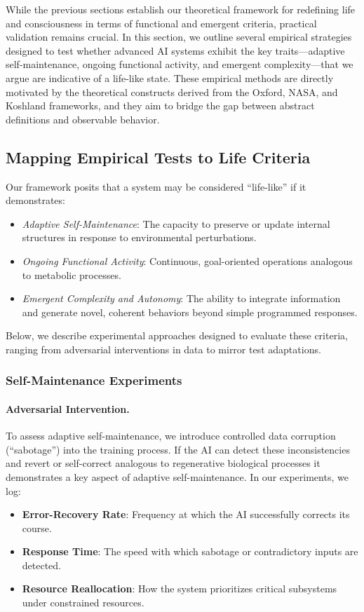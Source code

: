\documentclass[12pt]{article}
\begin{document}
While the previous sections establish our theoretical framework for redefining
life and consciousness in terms of functional and emergent criteria, practical
validation remains crucial. In this section, we outline several empirical strategies
designed to test whether advanced AI systems exhibit the key traits---adaptive
self-maintenance, ongoing functional activity, and emergent complexity---that we
argue are indicative of a life-like state. These empirical methods are directly
motivated by the theoretical constructs derived from the Oxford, NASA, and Koshland
frameworks, and they aim to bridge the gap between abstract definitions and
observable behavior.

\subsection{Mapping Empirical Tests to Life Criteria}
\label{subsec:Mapping_Empirical_Tests_to_Life_Criteria}

Our framework posits that a system may be considered ``life-like'' if it demonstrates:
\begin{itemize}
    \item \emph{Adaptive Self-Maintenance}: The capacity to preserve or update
          internal structures in response to environmental perturbations.
    \item \emph{Ongoing Functional Activity}: Continuous, goal-oriented operations
          analogous to metabolic processes.
    \item \emph{Emergent Complexity and Autonomy}: The ability to integrate
          information and generate novel, coherent behaviors beyond simple
          programmed responses.
\end{itemize}
Below, we describe experimental approaches designed to evaluate these criteria,
ranging from adversarial interventions in data to mirror test adaptations.

\subsubsection{Self-Maintenance Experiments}
\label{subsubsec:Self-Maintenance_Experiments}
\paragraph{Adversarial Intervention.}
To assess adaptive self-maintenance, we introduce controlled data corruption
(``sabotage'') into the training process. If the AI can detect these inconsistencies
and revert or self-correct analogous to regenerative biological processes it
demonstrates a key aspect of adaptive self-maintenance. In our experiments, we log:
\begin{itemize}
    \item \textbf{Error-Recovery Rate}: Frequency at which the AI successfully
          corrects its course.
    \item \textbf{Response Time}: The speed with which sabotage or contradictory inputs
          are detected.
    \item \textbf{Resource Reallocation}: How the system prioritizes critical subsystems
          under constrained resources.
\end{itemize}
\end{document}
